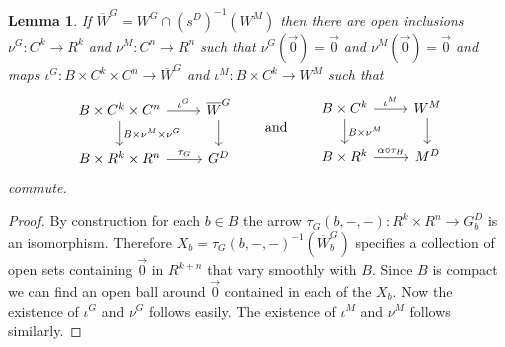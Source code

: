 \documentclass[pdftex]{sigma}
\numberwithin{equation}{section}
\newtheorem{Lemma}[Theorem]{Lemma}
\begin{document}
\begin{Lemma}\label{open-inclusions}
If $\overline{W}^G=W^G \cap (s^D)^{-1}(W^M)$ then there are open inclusions $\nu^G\colon C^k\rightarrow R^k$ and $\nu^M\colon C^n\rightarrow R^n$ such that $\nu^G(\vec{0})=\vec{0}$ and $\nu^M(\vec{0})=\vec{0}$ and maps $\iota^G\colon B\times C^k\times C^n\rightarrow \overline{W}^G$ and $\iota^M\colon B\times C^k\rightarrow W^M$ such that
\begin{equation*}\begin{tikzcd}
B\times C^k\times C^n \rar{\iota^G} \dar{B\times \nu^M\times \nu^G} & \overline{W}^G \dar\\
B\times R^k\times R^n \rar{\tau_G} & G^D
\end{tikzcd}\qquad \text{and}\qquad
\begin{tikzcd}
B\times C^k \rar{\iota^M} \dar{B\times \nu^M} & W^M \dar \\
B\times R^k \rar{\alpha\circ\tau_H} & M^D
\end{tikzcd}\end{equation*}
commute.
\end{Lemma}
\begin{proof} By construction for each $b\in B$ the arrow $\tau_G(b,-,-)\colon R^k\times R^n\rightarrow G^D _b$ is an isomorphism. Therefore $X_b = \tau_G(b,-,-)^{-1}(\overline{W}^G _b)$ specif\/ies a collection of open sets containing $\vec{0}$ in $R^{k+n}$ that vary smoothly with $B$. Since $B$ is compact we can f\/ind an open ball around $\vec{0}$ contained in each of the $X_b$. Now the existence of $\iota^G$ and $\nu^G$ follows easily. The existence of $\iota^M$ and $\nu^M$ follows similarly.
\end{proof}
\end{document}
